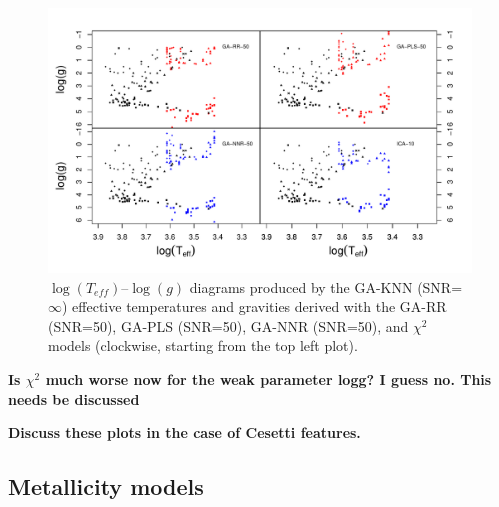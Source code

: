 \begin{figure}
 \begin{center}
   \includegraphics[width=\textwidth]{figs/ordieres-fig4.pdf}
 \caption{$\log(T_{eff})$--$\log(g)$ diagrams produced by the GA-KNN
   (SNR=$\infty$) effective temperatures and gravities derived with
   the GA-RR (SNR=50), GA-PLS (SNR=50), GA-NNR (SNR=50), and $\chi^2$ models (clockwise, starting from
   the top left plot).}
 \label{fig:lt_lg_ga}
 \end{center}
\end{figure}

{\bf Is $\chi^2$ much worse now for the weak parameter logg? I guess
  no. This needs be discussed}

{\bf Discuss these plots in the case of Cesetti features.}

\subsection{Metallicity models} 

